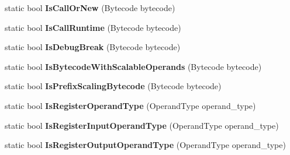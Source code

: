 \begin{DoxyCompactItemize}
\item 
static bool {\bfseries Is\+Call\+Or\+New} (Bytecode bytecode)\hypertarget{classv8_1_1internal_1_1interpreter_1_1_bytecodes_aa25a06e29323dc63d051c095b82c0447}{}\label{classv8_1_1internal_1_1interpreter_1_1_bytecodes_aa25a06e29323dc63d051c095b82c0447}

\item 
static bool {\bfseries Is\+Call\+Runtime} (Bytecode bytecode)\hypertarget{classv8_1_1internal_1_1interpreter_1_1_bytecodes_a9ff838be75b2f83428764cd89d16a1f3}{}\label{classv8_1_1internal_1_1interpreter_1_1_bytecodes_a9ff838be75b2f83428764cd89d16a1f3}

\item 
static bool {\bfseries Is\+Debug\+Break} (Bytecode bytecode)\hypertarget{classv8_1_1internal_1_1interpreter_1_1_bytecodes_a7c63b8f1b462a5bf34d4a542403d78c8}{}\label{classv8_1_1internal_1_1interpreter_1_1_bytecodes_a7c63b8f1b462a5bf34d4a542403d78c8}

\item 
static bool {\bfseries Is\+Bytecode\+With\+Scalable\+Operands} (Bytecode bytecode)\hypertarget{classv8_1_1internal_1_1interpreter_1_1_bytecodes_af0cf9ed0b1fa6d5cd1f258194cfaadc4}{}\label{classv8_1_1internal_1_1interpreter_1_1_bytecodes_af0cf9ed0b1fa6d5cd1f258194cfaadc4}

\item 
static bool {\bfseries Is\+Prefix\+Scaling\+Bytecode} (Bytecode bytecode)\hypertarget{classv8_1_1internal_1_1interpreter_1_1_bytecodes_a78a5111fe5c1ed077793b1f07ad04303}{}\label{classv8_1_1internal_1_1interpreter_1_1_bytecodes_a78a5111fe5c1ed077793b1f07ad04303}

\item 
static bool {\bfseries Is\+Register\+Operand\+Type} (Operand\+Type operand\+\_\+type)\hypertarget{classv8_1_1internal_1_1interpreter_1_1_bytecodes_a7d3c91ed23038a19976d8af9da043f51}{}\label{classv8_1_1internal_1_1interpreter_1_1_bytecodes_a7d3c91ed23038a19976d8af9da043f51}

\item 
static bool {\bfseries Is\+Register\+Input\+Operand\+Type} (Operand\+Type operand\+\_\+type)\hypertarget{classv8_1_1internal_1_1interpreter_1_1_bytecodes_abc577a8cd4f913460335fc176437ad5e}{}\label{classv8_1_1internal_1_1interpreter_1_1_bytecodes_abc577a8cd4f913460335fc176437ad5e}

\item 
static bool {\bfseries Is\+Register\+Output\+Operand\+Type} (Operand\+Type operand\+\_\+type)\hypertarget{classv8_1_1internal_1_1interpreter_1_1_bytecodes_a626ffd237701bcfeea88cbe36c9e2e3b}{}\label{classv8_1_1internal_1_1interpreter_1_1_bytecodes_a626ffd237701bcfeea88cbe36c9e2e3b}


\end{DoxyCompactItemize}
